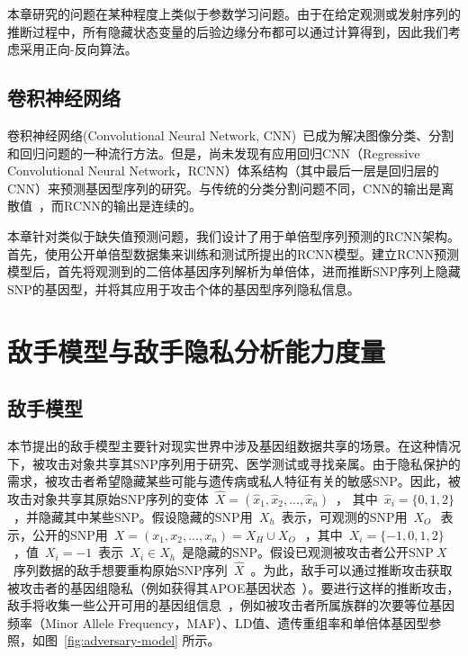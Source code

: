 本章研究的问题在某种程度上类似于参数学习问题。由于在给定观测或发射序列的推断过程中，所有隐藏状态变量的后验边缘分布都可以通过计算得到，因此我们考虑采用正向-反向算法。

\subsection{卷积神经网络}

卷积神经网络(Convolutional Neural Network, CNN)~\cite{long2017fully,scutti2018what}已成为解决图像分类、分割和回归问题的一种流行方法。但是，尚未发现有应用回归CNN（Regressive Convolutional Neural Network，RCNN）体系结构（其中最后一层是回归层的CNN）来预测基因型序列的研究。与传统的分类分割问题不同，CNN的输出是离散值~\cite{scutti2018what}，而RCNN的输出是连续的。

本章针对类似于缺失值预测问题，我们设计了用于单倍型序列预测的RCNN架构。首先，使用公开单倍型数据集来训练和测试所提出的RCNN模型。建立RCNN预测模型后，首先将观测到的二倍体基因序列解析为单倍体，进而推断SNP序列上隐藏SNP的基因型，并将其应用于攻击个体的基因型序列隐私信息。


\section{敌手模型与敌手隐私分析能力度量}\label{sec:adver}

\subsection{敌手模型}

本节提出的敌手模型主要针对现实世界中涉及基因组数据共享的场景。在这种情况下，被攻击对象共享其SNP序列用于研究、医学测试或寻找亲属。由于隐私保护的需求，被攻击者希望隐藏某些可能与遗传病或私人特征有关的敏感SNP。因此，被攻击对象共享其原始SNP序列的变体~$\hat{X}=(\hat{x}_1,\hat{x}_2, ... , \hat{x}_n)$~， 其中~$\hat{x}_i =\{0,1,2\}$~，并隐藏其中某些SNP。假设隐藏的SNP用~$X_h$~表示，可观测的SNP用~$X_O~$~表示，公开的SNP用~$X=(x_1, x_2, ..., x_n)=X_H \cup X_O~$~，其中~$X_i =\{-1,0,1,2\}$~，值~$X_i=-1$~表示~$X_i\in X_h$~是隐藏的SNP。假设已观测被攻击者公开SNP$~X$~序列数据的敌手想要重构原始SNP序列~$\hat{X}$~。为此，敌手可以通过推断攻击获取被攻击者的基因组隐私（例如获得其APOE基因状态~\cite{nyholt2009jim}）。要进行这样的推断攻击，敌手将收集一些公开可用的基因组信息~\cite{IGSR2019,howie2014impute2}，例如被攻击者所属族群的次要等位基因频率（Minor Allele Frequency，MAF）、LD值、遗传重组率和单倍体基因型参照，如图~\ref{fig:adversary-model} 所示。

